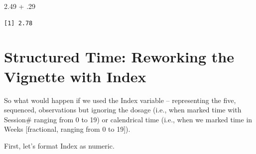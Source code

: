 \documentclass[
  11pt,
]{book}
\newenvironment{Shaded}{\begin{snugshade}}{\end{snugshade}}
\newcommand{\AttributeTok}[1]{\textcolor[rgb]{0.77,0.63,0.00}{#1}}
\newcommand{\DecValTok}[1]{\textcolor[rgb]{0.00,0.00,0.81}{#1}}
\newcommand{\FloatTok}[1]{\textcolor[rgb]{0.00,0.00,0.81}{#1}}
\newcommand{\FunctionTok}[1]{\textcolor[rgb]{0.00,0.00,0.00}{#1}}
\newcommand{\NormalTok}[1]{#1}
\newcommand{\OtherTok}[1]{\textcolor[rgb]{0.56,0.35,0.01}{#1}}
\newcommand{\SpecialCharTok}[1]{\textcolor[rgb]{0.00,0.00,0.00}{#1}}
\begin{document}
\begin{Shaded}
\begin{Highlighting}[]
\FloatTok{2.49} \SpecialCharTok{+}\NormalTok{ .}\DecValTok{29}
\end{Highlighting}
\end{Shaded}

\begin{verbatim}
[1] 2.78
\end{verbatim}

\hypertarget{structured-time-reworking-the-vignette-with-index}{%
\section{Structured Time: Reworking the Vignette with Index}\label{structured-time-reworking-the-vignette-with-index}}

So what would happen if we used the Index variable -- representing the five, sequenced, observations but ignoring the dosage (i.e., when marked time with Session\# ranging from 0 to 19) or calendrical time (i.e., when we marked time in Weeks {[}fractional, ranging from 0 to 19{]}).

First, let's format Index as numeric.

\begin{Shaded}
\end{Shaded}
\end{document}
